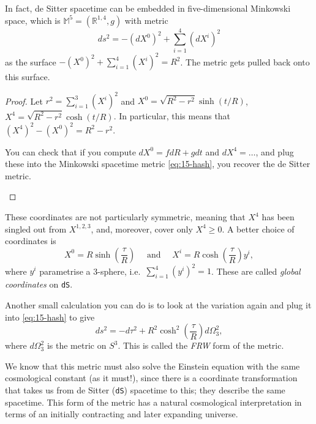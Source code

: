 \begin{claim}
  In fact, de Sitter spacetime can be embedded in five-dimensional Minkowski space, which is $\mathbb{M}^5 = (\mathbb{R}^{1, 4}, g)$ with metric
  \begin{equation}
    \label{eq:15-hash}
    ds^2 = -(dX^0)^2 + \sum_{i=1}^{4} (dX^{i})^2
  \end{equation}
  as the surface $-(X^0)^2 + \sum_{i=1}^{4} (X^{i})^2 = R^2$.
  The metric gets pulled back onto this surface.
\end{claim}
\begin{proof}
  Let $r^2 = \sum_{i=1}^{3} (X^{i})^2$ and $X^0 = \sqrt{R^2 - r^2} \sinh(t/R)$, $X^4 = \sqrt{R^2 - r^2} \cosh(t/R)$. In particular, this means that $(X^4)^2 - (X^0)^2 = R^2 - r^2$.
  \begin{exercise}
    You can check that if you compute $dX^0 = f dR + g dt$ and $dX^4 = \dots$, and plug these into the Minkowski spacetime metric \eqref{eq:15-hash}, you recover the de Sitter metric.
  \end{exercise}
\end{proof}
These coordinates are not particularly symmetric, meaning that $X^4$ has been singled out from $X^{1, 2, 3}$, and, moreover, cover only $X^4 \geq 0$.
A better choice of coordinates is
\begin{equation}
  X^0 = R\sinh( \frac{\tau}{R}) \quad \text{ and } \quad X^{i} = R \cosh( \frac{\tau}{R}) y^{i},
\end{equation}
where $y^{i}$ parametrise a 3-sphere, i.e.~$\sum_{i = 1}^{4} (y^{i})^2 = 1$.
These are called \emph{global coordinates} on \texttt{dS}.
\begin{exercise}
  Another small calculation you can do is to look at the variation again and plug it into \eqref{eq:15-hash} to give
  \begin{equation}
    ds^2 = -d\tau^2 + R^2 \cosh^2\left(\frac{\tau}{R}\right) d\Omega^2_3,
  \end{equation}
  where $d\Omega_3^2$ is the metric on $S^3$.
  This is called the \emph{FRW} form of the metric.
\end{exercise}
We know that this metric must also solve the Einstein equation with the same cosmological constant (as it must!), since there is a coordinate transformation that takes us from de Sitter (\texttt{dS}) spacetime to this; they describe the same spacetime.
This form of the metric has a natural cosmological interpretation in terms of an initially contracting and later expanding universe.
